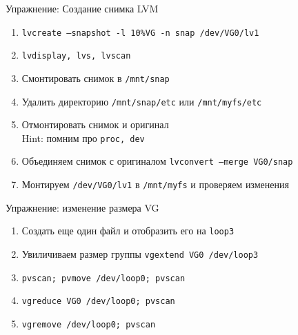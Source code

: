 \documentclass[ignorenonframetext, professionalfonts, hyperref={pdftex, unicode}]{beamer}
\begin{document}
\begin{frame}{Упражнение: Создание снимка LVM}
  \begin{enumerate}
    \item  {\tt lvcreate --snapshot -l 10\%VG -n snap /dev/VG0/lv1}
    \item  {\tt lvdisplay, lvs, lvscan}
	\item Смонтировать снимок в {\tt /mnt/snap}
		\pause
	\item Удалить директорию {\tt /mnt/snap/etc} или {\tt /mnt/myfs/etc}
	\item Отмонтировать снимок и оригинал\\
		Hint: помним про {\tt proc, dev}
		\pause
	\item Объединяем снимок с оригиналом {\tt lvconvert --merge VG0/snap}
	\item Монтируем {\tt /dev/VG0/lv1} в {\tt /mnt/myfs} и проверяем изменения
  \end{enumerate}
\end{frame}

\begin{frame}{Упражнение: изменение размера VG}
  \begin{enumerate}
	\item Создать еще один файл и отобразить его на {\tt loop3}
	\item Увиличиваем размер группы {\tt vgextend VG0 /dev/loop3}
		\pause
    \item  {\tt pvscan; pvmove /dev/loop0; pvscan}
    \item  {\tt vgreduce VG0 /dev/loop0; pvscan}
    \item  {\tt vgremove /dev/loop0; pvscan}
  \end{enumerate}
\end{frame}
\end{document}

